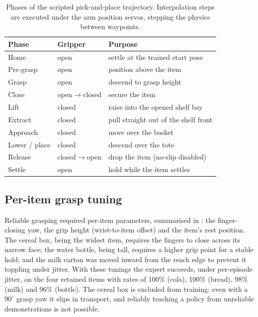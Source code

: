 \begin{table}[ht]
\caption{Phases of the scripted pick-and-place trajectory. Interpolation steps are
executed under the arm position servos, stepping the physics between waypoints.}
\begin{center}
\begin{tabular}{lll}
\toprule
Phase & Gripper & Purpose \\
\midrule
Home              & open          & settle at the trained start pose \\
Pre-grasp         & open          & position above the item \\
Grasp             & open          & descend to grasp height \\
Close             & open$\to$closed & secure the item \\
Lift              & closed        & raise into the opened shelf bay \\
Extract           & closed        & pull straight out of the shelf front \\
Approach          & closed        & move over the basket \\
Lower / place     & closed        & descend over the tote \\
Release           & closed$\to$open & drop the item (no-slip disabled) \\
Settle            & open          & hold while the item settles \\
\bottomrule
\end{tabular}
\end{center}
\label{tab:phases}
\end{table}

\subsection{Per-item grasp tuning}
\label{sec:m-grasp}
Reliable grasping required per-item parameters, summarised in
: the finger-closing yaw, the grip height (wrist-to-item
offset) and the item's rest position. The cereal box, being the widest item,
requires the fingers to close across its narrow face; the water bottle, being
tall, requires a higher grip point for a stable hold; and the milk carton was
moved inward from the reach edge to prevent it toppling under jitter. With these
tunings the expert succeeds, under per-episode jitter, on the four retained items
with rates of 100\% (cola), 100\% (bread), 98\% (milk) and 96\% (bottle). The
cereal box is excluded from training: even with a $90^\circ$ grasp yaw it slips in
transport, and reliably teaching a policy from unreliable demonstrations is not
possible.

